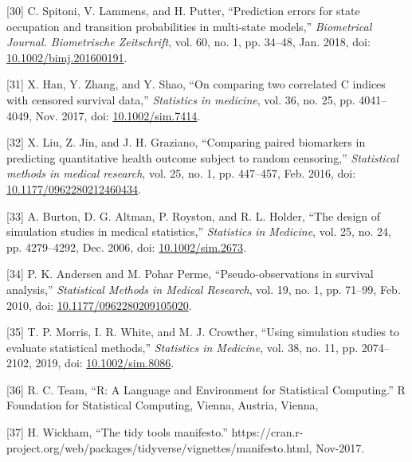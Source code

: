 \documentclass[12pt,PhD,twoside,openright]{muthesis}
\newenvironment{cslreferences}%
  {}%
  {\par}
\begin{document}
\begin{cslreferences}
\leavevmode\hypertarget{ref-spitoni_prediction_2018}{}%
{[}30{]} C. Spitoni, V. Lammens, and H. Putter, ``Prediction errors for state occupation and transition probabilities in multi-state models,'' \emph{Biometrical Journal. Biometrische Zeitschrift}, vol. 60, no. 1, pp. 34--48, Jan. 2018, doi: \href{https://doi.org/10.1002/bimj.201600191}{10.1002/bimj.201600191}.

\leavevmode\hypertarget{ref-han_comparing_2017}{}%
{[}31{]} X. Han, Y. Zhang, and Y. Shao, ``On comparing two correlated C indices with censored survival data,'' \emph{Statistics in medicine}, vol. 36, no. 25, pp. 4041--4049, Nov. 2017, doi: \href{https://doi.org/10.1002/sim.7414}{10.1002/sim.7414}.

\leavevmode\hypertarget{ref-liu_comparing_2016}{}%
{[}32{]} X. Liu, Z. Jin, and J. H. Graziano, ``Comparing paired biomarkers in predicting quantitative health outcome subject to random censoring,'' \emph{Statistical methods in medical research}, vol. 25, no. 1, pp. 447--457, Feb. 2016, doi: \href{https://doi.org/10.1177/0962280212460434}{10.1177/0962280212460434}.

\leavevmode\hypertarget{ref-burton_design_2006}{}%
{[}33{]} A. Burton, D. G. Altman, P. Royston, and R. L. Holder, ``The design of simulation studies in medical statistics,'' \emph{Statistics in Medicine}, vol. 25, no. 24, pp. 4279--4292, Dec. 2006, doi: \href{https://doi.org/10.1002/sim.2673}{10.1002/sim.2673}.

\leavevmode\hypertarget{ref-andersen_pseudo-observations_2010}{}%
{[}34{]} P. K. Andersen and M. Pohar Perme, ``Pseudo-observations in survival analysis,'' \emph{Statistical Methods in Medical Research}, vol. 19, no. 1, pp. 71--99, Feb. 2010, doi: \href{https://doi.org/10.1177/0962280209105020}{10.1177/0962280209105020}.

\leavevmode\hypertarget{ref-morris_using_2019}{}%
{[}35{]} T. P. Morris, I. R. White, and M. J. Crowther, ``Using simulation studies to evaluate statistical methods,'' \emph{Statistics in Medicine}, vol. 38, no. 11, pp. 2074--2102, 2019, doi: \href{https://doi.org/10.1002/sim.8086}{10.1002/sim.8086}.

\leavevmode\hypertarget{ref-r_core_team_r_nodate}{}%
{[}36{]} R. C. Team, ``R: A Language and Environment for Statistical Computing.'' R Foundation for Statistical Computing, Vienna, Austria, Vienna,

\leavevmode\hypertarget{ref-wickham_tidy_2017}{}%
{[}37{]} H. Wickham, ``The tidy tools manifesto.'' https://cran.r-project.org/web/packages/tidyverse/vignettes/manifesto.html, Nov-2017.


\end{cslreferences}
\end{document}
